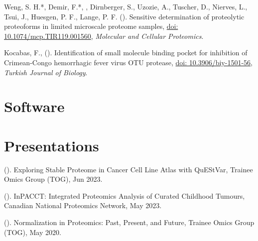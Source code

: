 \documentclass[line]{resonancecv}
\begin{document}
\begin{resume}
\begin{publist}
\item Weng, S. H.*, Demir, F.*, , Dirnberger, S., Uzozie, A., Tuscher, D., Nierves, L., Tsui, J., Huesgen, P. F., Lange, P. F. (). Sensitive determination of proteolytic proteoforms in limited microscale proteome samples, \href{https://doi.org/10.1074/mcp.TIR119.001560}{doi: 10.1074/mcp.TIR119.001560}, \emph{Molecular and Cellular Proteomics}.
\item Kocabas, F.,  (). Identification of small molecule binding pocket for inhibition of Crimean-Congo hemorrhagic fever virus OTU protease, \href{https://doi.org/10.3906/biy-1501-56}{doi: 10.3906/biy-1501-56}, \emph{Turkish Journal of Biology}.
\end{publist}

\section{Software}



\section{Presentations}
\begin{publist}
\item {} (). Exploring Stable Proteome in Cancer Cell Line Atlas with QuEStVar, Trainee Omics Group (TOG), Jun 2023.
\item {} (). InPACCT: Integrated Proteomics Analysis of Curated Childhood Tumours, Canadian National Proteomics Network, May 2023.
\item {} (). Normalization in Proteomics: Past, Present, and Future, Trainee Omics Group (TOG), May 2020.
\end{publist}


\end{resume}
\end{document}
